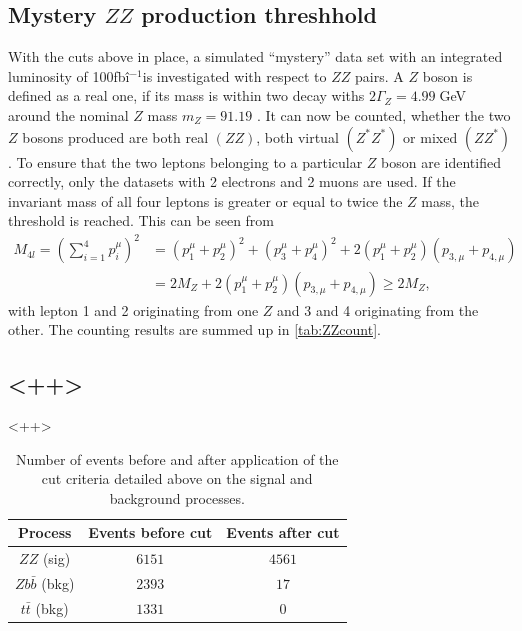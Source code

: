 \documentclass[twoside,        %
               BCOR12mm,       %
               ngerman,english, %
               fleqn,headsepline=false,footsepline=false
              ]{Vorlage/MFPREPORT}
\begin{document}
\subsection{Mystery $ZZ$ production threshhold}
With the cuts above in place, a simulated ``mystery'' data set with an
integrated luminosity of 100\;fbî$^{-1}$is investigated with respect to $ZZ$
pairs. A $Z$ boson is defined as a real one, if its mass is within two decay
withs $2\Gamma_Z=4.99\;$GeV around the nominal $Z$ mass $m_Z=91.19$
\cite{pdataz}. It can now be counted, whether the two $Z$ bosons produced are
both real $(ZZ)$, both virtual $(Z^*Z^*)$ or mixed $(ZZ^{*})$. To ensure that
the two leptons belonging to a particular $Z$ boson are identified correctly,
only the datasets with 2 electrons and 2 muons are used.
If the invariant mass of all four leptons is greater or equal to twice the $Z$
mass, the threshold is reached. This can be seen from
\begin{align}
    \label{eq:threshhold}
    M_{4l}=(\sum_{i=1}^4p_i^\mu)^2&=(p_1^\mu+p_2^\mu)^2+(p_3^\mu+p_4^\mu)^2+2(p_1^{\mu}+p_2^{\mu})(p_{3,\mu}+p_{4,\mu})\\
    &=2M_Z+2(p_1^{\mu}+p_2^{\mu})(p_{3,\mu}+p_{4,\mu})\geq2M_Z,
\end{align}
with lepton 1 and 2 originating from one $Z$ and 3 and 4 originating from the
other. The counting results are summed up in \cref{tab:ZZcount}.







\subsection{<++>}<++>

\begin{table}
\centering
\begin{tabular}{|c|c|c|}
\hline
Process& Events before cut& Events after cut\\
\hline
$ZZ$ (sig)&$6151$&$4561$\\
\hline
$Zb\bar b$ (bkg)& $2393$&$17$\\
\hline
$t\bar t$ (bkg)&$1331$&$0$\\
\hline
\end{tabular}
\caption{Number of events before and after
application of the cut criteria detailed
above on the signal and background
processes.}
\label{tab:cutresults}
\end{table}
\end{document}
